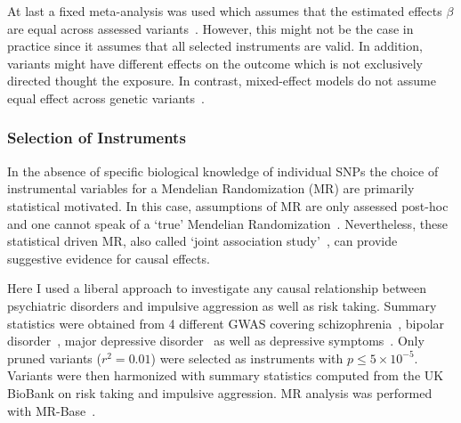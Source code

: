 At last a fixed meta-analysis was used which assumes that the estimated effects $\beta$ are equal across assessed variants~\cite{Burgess2015b}.
However, this might not be the case in practice since it assumes that all selected instruments are valid.
In addition, variants might have different effects on the outcome which is not exclusively directed thought the exposure. 
In contrast, mixed-effect models do not assume equal effect across genetic variants~\cite{Burgess2015b}.

\subsubsection{Selection of Instruments}
\label{ssub:Selection_of_Intstuments}

In the absence of specific biological knowledge of individual SNPs the choice of instrumental variables for a Mendelian Randomization (MR) are primarily statistical motivated.
In this case, assumptions of MR are only assessed post-hoc and one cannot speak of a `true' Mendelian Randomization~\cite{Burgess2016a}.
Nevertheless, these statistical driven MR, also called `joint association study'~\cite{Burgess2016a}, can provide suggestive evidence for causal effects.

Here I used a liberal approach to investigate any causal relationship between psychiatric disorders and impulsive aggression as well as risk taking.
Summary statistics were obtained from 4 different GWAS covering schizophrenia~\cite{Ripke2014}, bipolar disorder~\cite{PsychiatricGWASConsortiumBipolarDisorderWorkingGroup2011}, major depressive disorder~\cite{MajorDepressiveDisorderWorkingGroupofthePsychiatricGWASConsortium2013} as well as depressive symptoms~\cite{Okbay2016}.
Only pruned variants ($r^2=0.01$) were selected as instruments with $p\leq 5\times 10^{-5}$.
Variants were then harmonized with summary statistics computed from the UK BioBank on risk taking and impulsive aggression. 
MR analysis was performed with MR-Base~\cite{Hemani2016}.




